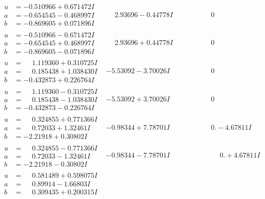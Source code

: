 \documentclass[1p]{elsarticle_modified}
\theoremstyle{definition}
\begin{document}
$$\begin{array}{c|c|c}
\begin{aligned}
u &= -0.510966 + 0.671472 I \\
a &= -0.654545 - 0.468997 I \\
b &= -0.869605 + 0.071896 I\end{aligned}
 & \phantom{-}2.93696 - 0.44778 I & \phantom{-0.000000 } 0 \\ \hline\begin{aligned}
u &= -0.510966 - 0.671472 I \\
a &= -0.654545 + 0.468997 I \\
b &= -0.869605 - 0.071896 I\end{aligned}
 & \phantom{-}2.93696 + 0.44778 I & \phantom{-0.000000 } 0 \\ \hline\begin{aligned}
u &= \phantom{-}1.119360 + 0.310725 I \\
a &= \phantom{-}0.185438 + 1.038430 I \\
b &= -0.432873 + 0.226764 I\end{aligned}
 & -5.53092 - 3.70026 I & \phantom{-0.000000 } 0 \\ \hline\begin{aligned}
u &= \phantom{-}1.119360 - 0.310725 I \\
a &= \phantom{-}0.185438 - 1.038430 I \\
b &= -0.432873 - 0.226764 I\end{aligned}
 & -5.53092 + 3.70026 I & \phantom{-0.000000 } 0 \\ \hline\begin{aligned}
u &= \phantom{-}0.324855 + 0.771366 I \\
a &= \phantom{-}0.72033 + 1.32461 I \\
b &= -2.21918 + 0.30802 I\end{aligned}
 & -0.98344 + 7.78701 I & \phantom{-0.000000 } 0. - 4.67811 I \\ \hline\begin{aligned}
u &= \phantom{-}0.324855 - 0.771366 I \\
a &= \phantom{-}0.72033 - 1.32461 I \\
b &= -2.21918 - 0.30802 I\end{aligned}
 & -0.98344 - 7.78701 I & \phantom{-0.000000 -}0. + 4.67811 I \\ \hline\begin{aligned}
u &= \phantom{-}0.581489 + 0.598075 I \\
a &= \phantom{-}0.89914 - 1.66803 I \\
b &= \phantom{-}0.309435 + 0.200315 I\end{aligned}

\end{array}$$
\end{document}
